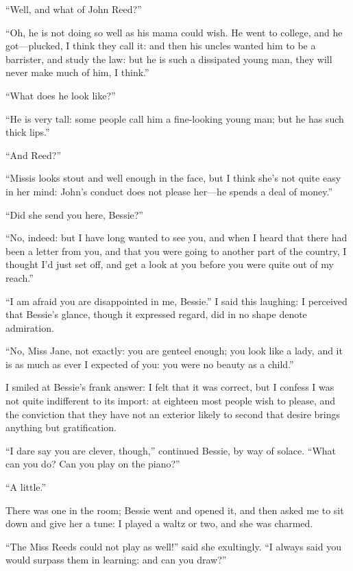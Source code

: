\enquote{Well, and what of John Reed?}

\enquote{Oh, he is not doing so well as his mama could wish. He went to
college, and he got---plucked, I think they call it: and then his uncles
wanted him to be a barrister, and study the law: but he is such a
dissipated young man, they will never make much of him, I think.}

\enquote{What does he look like?}

\enquote{He is very tall: some people call him a fine-looking young man;
but he has such thick lips.}

\enquote{And \Mrs{} Reed?}

\enquote{Missis looks stout and well enough in the face, but I think
she's not quite easy in her mind: \Mr{} John's conduct does not please
her---he spends a deal of money.}

\enquote{Did she send you here, Bessie?}

\enquote{No, indeed: but I have long wanted to see you, and when I heard
that there had been a letter from you, and that you were going to
another part of the country, I thought I'd just set off, and get a look
at you before you were quite out of my reach.}

\enquote{I am afraid you are disappointed in me, Bessie.} I said this
laughing: I perceived that Bessie's glance, though it expressed regard,
did in no shape denote admiration.

\enquote{No, Miss Jane, not exactly: you are genteel enough; you look
like a lady, and it is as much as ever I expected of you: you were no
beauty as a child.}

I smiled at Bessie's frank answer: I felt that it was correct, but I
confess I was not quite indifferent to its import: at eighteen most
people wish to please, and the conviction that they have not an exterior
likely to second that desire brings anything but gratification.

\enquote{I dare say you are clever, though,} continued Bessie, by way of
solace. \enquote{What can you do? Can you play on the piano?}

\enquote{A little.}

There was one in the room; Bessie went and opened it, and then asked me
to sit down and give her a tune: I played a waltz or two, and she was
charmed.

\enquote{The Miss Reeds could not play as well!} said she exultingly. 
\enquote{I always said you would surpass them in learning: and can you
draw?}

